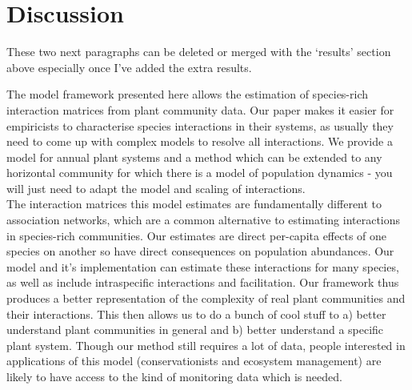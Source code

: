 \documentclass[a4,12pt]{article}
\begin{document}
\section{Discussion}
    
    These two next paragraphs can be deleted or merged with the ‘results’ section above especially once I’ve added the extra results. 

 
    
    The model framework presented here allows the estimation of species-rich interaction matrices from plant community data. Our paper makes it easier for empiricists to characterise species interactions in their systems, as usually they need to come up with complex models to resolve all interactions. We provide a model for annual plant systems and a method which can be extended to any horizontal community for which there is a model of population dynamics - you will just need to adapt the model and scaling of interactions. \\

    The interaction matrices this model estimates are fundamentally different to association networks, which are a common alternative to estimating interactions in species-rich communities. Our estimates are direct per-capita effects of one species on another so have direct consequences on population abundances. Our model and it's implementation can estimate these interactions for many species, as well as include intraspecific interactions and facilitation. Our framework thus produces a better representation of the complexity of real plant communities and their interactions. This then allows us to do a bunch of cool stuff to a) better understand plant communities in general and b) better understand a specific plant system. Though our method still requires a lot of data, people interested in applications of this model (conservationists and ecosystem management) are likely to have access to the kind of monitoring data which is needed.  


\end{document}
